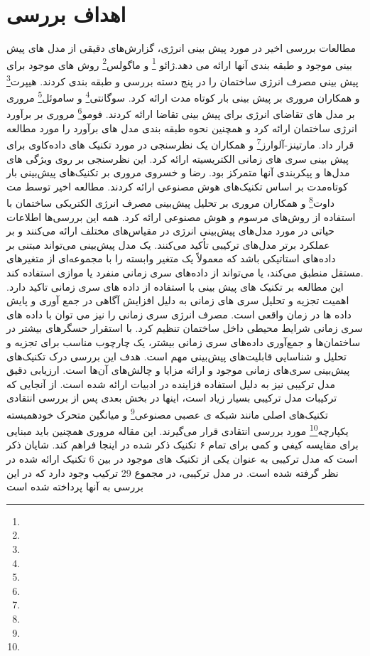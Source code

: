 \section[اهداف بررسی]{اهداف بررسی\cite{DEB2017902}}
مطالعات بررسی اخیر در مورد پیش بینی انرژی، گزارش‌های دقیقی از مدل های پیش بینی موجود و طبقه بندی آنها ارائه می دهد.ژائو \footnote{} و ماگولس\footnote{} روش های موجود برای پیش بینی مصرف انرژی ساختمان را در پنج دسته بررسی و طبقه بندی کردند. هیپرت\footnote{} و همکاران مروری بر پیش بینی بار کوتاه مدت ارائه کرد. سوگانتی\footnote{} و ساموئل\footnote{} مروری بر مدل های تقاضای انرژی برای پیش بینی تقاضا ارائه کردند. فومو\footnote{} مروری بر برآورد انرژی ساختمان ارائه کرد و همچنین نحوه طبقه بندی مدل های برآورد را مورد مطالعه قرار داد. مارتینز-آلوارز\footnote{} و همکاران یک نظرسنجی در مورد تکنیک های داده‌کاوی برای پیش بینی سری های زمانی الکتریسیته ارائه کرد. این نظرسنجی بر روی ویژگی های مدل‌ها و پیکربندی آنها متمرکز بود. رضا و خسروی مروری بر تکنیک‌های پیش‌بینی بار کوتاه‌مدت بر اساس تکنیک‌های هوش مصنوعی ارائه کردند. مطالعه اخیر توسط مت داوت\footnote{} و همکاران مروری بر تحلیل پیش‌بینی مصرف انرژی الکتریکی ساختمان با استفاده از روش‌های مرسوم و هوش مصنوعی ارائه کرد. 
همه این بررسی‌ها اطلاعات حیاتی در مورد مدل‌های پیش‌بینی انرژی در مقیاس‌های مختلف ارائه می‌کنند و بر عملکرد برتر مدل‌های ترکیبی تأکید می‌کنند. یک مدل پیش‌بینی می‌تواند مبتنی بر داده‌های استاتیکی باشد که معمولاً یک متغیر وابسته را با مجموعه‌ای از متغیرهای مستقل منطبق می‌کند، یا می‌تواند از داده‌های سری زمانی منفرد یا موازی استفاده کند. 
\\
این مطالعه بر تکنیک های پیش بینی با استفاده از داده های سری زمانی تاکید دارد. اهمیت تجزیه و تحلیل سری های زمانی به دلیل افزایش آگاهی در جمع آوری و پایش داده ها در زمان واقعی است. مصرف انرژی سری زمانی را نیز می توان با داده های سری زمانی شرایط محیطی داخل ساختمان تنظیم کرد. با استقرار حسگرهای بیشتر در ساختمان‌ها و جمع‌آوری داده‌های سری زمانی بیشتر، یک چارچوب مناسب برای تجزیه و تحلیل و شناسایی قابلیت‌های پیش‌بینی مهم است. هدف این بررسی درک تکنیک‌های پیش‌بینی سری‌های زمانی موجود و ارائه مزایا و چالش‌های آن‌ها است. ارزیابی دقیق مدل ترکیبی نیز به دلیل استفاده فزاینده در ادبیات ارائه شده است. از آنجایی که ترکیبات مدل ترکیبی بسیار زیاد است، اینها در بخش بعدی پس از بررسی انتقادی تکنیک‌های اصلی مانند شبکه ی عصبی مصنوعی\footnote{} و میانگین متحرک خودهمبسته یکپارچه\footnote{} مورد بررسی انتقادی قرار می‌گیرند. این مقاله مروری همچنین باید مبنایی برای مقایسه کیفی و کمی برای تمام ۶ تکنیک ذکر شده در اینجا فراهم کند. شایان ذکر است که مدل ترکیبی به عنوان یکی از تکنیک های موجود در بین 6 تکنیک ارائه شده در نظر گرفته شده است. در مدل ترکیبی، در مجموع 29 ترکیب وجود دارد که در این بررسی به آنها پرداخته شده است
